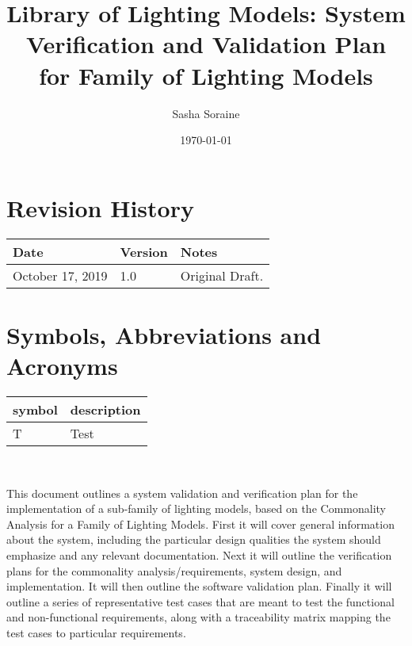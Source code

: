 \documentclass[12pt, titlepage]{article}
\begin{document}
\title{Library of Lighting Models: System Verification and Validation Plan for 
Family of Lighting Models} 
\author{Sasha Soraine}
\date{\today}
	
\maketitle


\section{Revision History}

\begin{tabularx}{\textwidth}{p{3cm}p{2cm}X}
\toprule {\bf Date} & {\bf Version} & {\bf Notes}\\
\midrule
October 17, 2019 & 1.0 & Original Draft.\\
\bottomrule
\end{tabularx}

\newpage

\tableofcontents

\listoftables

\listoffigures

\newpage

\section{Symbols, Abbreviations and Acronyms}

\renewcommand{\arraystretch}{1.2}
\begin{tabular}{l l} 
  \toprule		
  \textbf{symbol} & \textbf{description}\\
  \midrule 
  T & Test\\
  \bottomrule
\end{tabular}\\


\newpage


This document outlines a system validation and verification plan for the 
implementation of a sub-family of lighting models, based on the Commonality 
Analysis for a Family of Lighting Models. First it will cover general 
information about the system, including the particular design qualities the 
system should emphasize and any relevant documentation. Next it will outline 
the verification plans for the commonality analysis/requirements, system 
design, and implementation. It will then outline the software validation plan. 
Finally it will outline a series of representative test cases that are meant to 
test the functional and non-functional requirements, along with a traceability 
matrix mapping the test cases to particular requirements.
\end{document}
